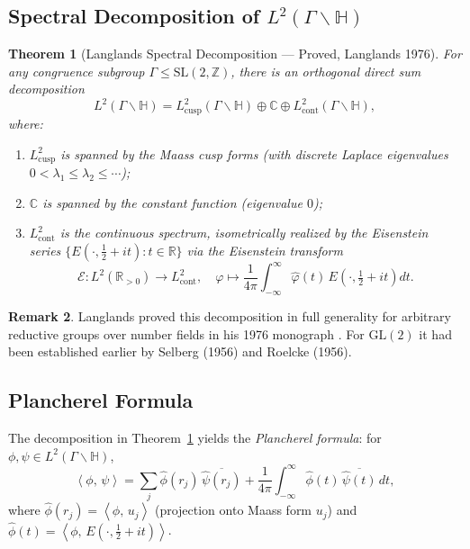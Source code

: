 \documentclass[12pt,a4paper]{amsart}
\newtheorem{theorem}{Theorem}[section]
\theoremstyle{definition}
\newtheorem{remark}[theorem]{Remark}
\newcommand{\HH}{\mathbb{H}}
\newcommand{\ZZ}{\mathbb{Z}}
\newcommand{\RR}{\mathbb{R}}
\newcommand{\CC}{\mathbb{C}}
\newcommand{\GL}{\mathrm{GL}}
\newcommand{\SL}{\mathrm{SL}}
\newcommand{\inner}[2]{\left\langle #1,\, #2 \right\rangle}
\begin{document}
\subsection{Spectral Decomposition of \texorpdfstring{$L^2(\Gamma \backslash \HH)$}{L2}}

\begin{theorem}[Langlands Spectral Decomposition — Proved, Langlands 1976]
\label{thm:langlands_decomp}
For any congruence subgroup $\Gamma \leq \SL(2,\ZZ)$, there is an orthogonal
direct sum decomposition
\[
L^2(\Gamma \backslash \HH) = L^2_{\mathrm{cusp}}(\Gamma \backslash \HH) \oplus \CC \oplus L^2_{\mathrm{cont}}(\Gamma \backslash \HH),
\]
where:
\begin{enumerate}[label=(\roman*)]
\item $L^2_{\mathrm{cusp}}$ is spanned by the \emph{Maass cusp forms}
  (with discrete Laplace eigenvalues $0 < \lambda_1 \leq \lambda_2 \leq \cdots$);
\item $\CC$ is spanned by the constant function (eigenvalue $0$);
\item $L^2_{\mathrm{cont}}$ is the continuous spectrum, isometrically realized by
  the Eisenstein series $\bigl\{E(\cdot,\tfrac{1}{2}+it) : t \in \RR\bigr\}$ via
  the Eisenstein transform
  \[
  \mathcal{E}: L^2(\RR_{>0}) \to L^2_{\mathrm{cont}},\quad
  \varphi \mapsto \frac{1}{4\pi}\int_{-\infty}^\infty \hat\varphi(t)\, E\!\left(\cdot, \tfrac{1}{2}+it\right) dt.
  \]
\end{enumerate}
\end{theorem}

\begin{remark}
Langlands proved this decomposition in full generality for arbitrary reductive groups
over number fields in his 1976 monograph \cite{langlands1976}. For $\GL(2)$ it had
been established earlier by Selberg (1956) and Roelcke (1956).
\end{remark}

\subsection{Plancherel Formula}

The decomposition in Theorem~\ref{thm:langlands_decomp} yields the \emph{Plancherel formula}:
for $\phi, \psi \in L^2(\Gamma \backslash \HH)$,
\[
\inner{\phi}{\psi} = \sum_j \hat\phi(r_j)\, \overline{\hat\psi(r_j)}
+ \frac{1}{4\pi} \int_{-\infty}^\infty \hat\phi(t)\, \overline{\hat\psi(t)}\, dt,
\]
where $\hat\phi(r_j) = \inner{\phi}{u_j}$ (projection onto Maass form $u_j$) and
$\hat\phi(t) = \inner{\phi}{E(\cdot, \frac{1}{2}+it)}$.
\end{document}
